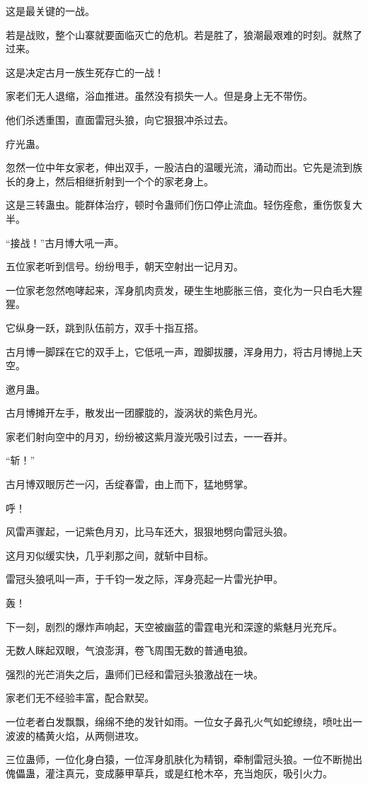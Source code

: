 \begin{this_body}
这是最关键的一战。

若是战败，整个山寨就要面临灭亡的危机。若是胜了，狼潮最艰难的时刻。就熬了过来。

这是决定古月一族生死存亡的一战！

家老们无人退缩，浴血推进。虽然没有损失一人。但是身上无不带伤。

他们杀透重围，直面雷冠头狼，向它狠狠冲杀过去。

疗光蛊。

忽然一位中年女家老，伸出双手，一股洁白的温暖光流，涌动而出。它先是流到族长的身上，然后相继折射到一个个的家老身上。

这是三转蛊虫。能群体治疗，顿时令蛊师们伤口停止流血。轻伤痊愈，重伤恢复大半。

“接战！”古月博大吼一声。

五位家老听到信号。纷纷甩手，朝天空射出一记月刃。

一位家老忽然咆哮起来，浑身肌肉贲发，硬生生地膨胀三倍，变化为一只白毛大猩猩。

它纵身一跃，跳到队伍前方，双手十指互搭。

古月博一脚踩在它的双手上，它低吼一声，蹬脚拔腰，浑身用力，将古月博抛上天空。

邀月蛊。

古月博摊开左手，散发出一团朦胧的，漩涡状的紫色月光。

家老们射向空中的月刃，纷纷被这紫月漩光吸引过去，一一吞并。

“斩！”

古月博双眼厉芒一闪，舌绽春雷，由上而下，猛地劈掌。

呼！

风雷声骤起，一记紫色月刃，比马车还大，狠狠地劈向雷冠头狼。

这月刃似缓实快，几乎刹那之间，就斩中目标。

雷冠头狼吼叫一声，于千钧一发之际，浑身亮起一片雷光护甲。

轰！

下一刻，剧烈的爆炸声响起，天空被幽蓝的雷霆电光和深邃的紫魅月光充斥。

无数人眯起双眼，气浪澎湃，卷飞周围无数的普通电狼。

强烈的光芒消失之后，蛊师们已经和雷冠头狼激战在一块。

家老们无不经验丰富，配合默契。

一位老者白发飘飘，绵绵不绝的发针如雨。一位女子鼻孔火气如蛇缭绕，喷吐出一波波的橘黄火焰，从两侧进攻。

三位蛊师，一位化身白猿，一位浑身肌肤化为精钢，牵制雷冠头狼。一位不断抛出傀儡蛊，灌注真元，变成藤甲草兵，或是红枪木卒，充当炮灰，吸引火力。


\end{this_body}
